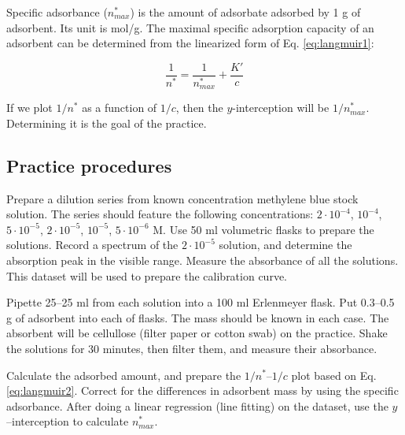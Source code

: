 Specific adsorbance ($n^*_{max}$) is the amount of adsorbate adsorbed by 1 g of adsorbent. Its unit is mol/g. The maximal specific adsorption capacity of an adsorbent can be determined from the linearized form of Eq. \ref{eq:langmuir1}:

\begin{equation}
\label{eq:langmuir2}
        \frac{1}{n^*}
        =
        \frac{1}{n^*_{max}}
	+
	\frac{K'}{c}
\end{equation}

If we plot $1/n^*$ as a function of $1/c$, then the $y$-interception will be $1/n^*_{max}$. Determining it is the goal of the practice.

\subsection{Practice procedures}

Prepare a dilution series from known concentration methylene blue stock solution. The series should feature the following concentrations: $2\cdot10^{-4}$, $10^{-4}$, $5\cdot10^{-5}$, $2\cdot10^{-5}$, $10^{-5}$, $5\cdot10^{-6}$ M. Use 50 ml volumetric flasks to prepare the solutions. Record a spectrum of the $2\cdot10^{-5}$ solution, and determine the absorption peak in the visible range. Measure the absorbance of all the solutions. This dataset will be used to prepare the calibration curve.

Pipette 25--25 ml from each solution into a 100 ml Erlenmeyer flask. Put 0.3--0.5 g of adsorbent into each of flasks. The mass should be known in each case. The absorbent will be cellullose (filter paper or cotton swab) on the practice.
Shake the solutions for 30 minutes, then filter them, and measure their absorbance.

Calculate the adsorbed amount, and prepare the $1/n^*$--$1/c$ plot based on Eq. \ref{eq:langmuir2}. Correct for the differences in adsorbent mass by using the specific adsorbance.
After doing a linear regression (line fitting) on the dataset, use the $y$--interception to calculate $n^*_{max}$. 


